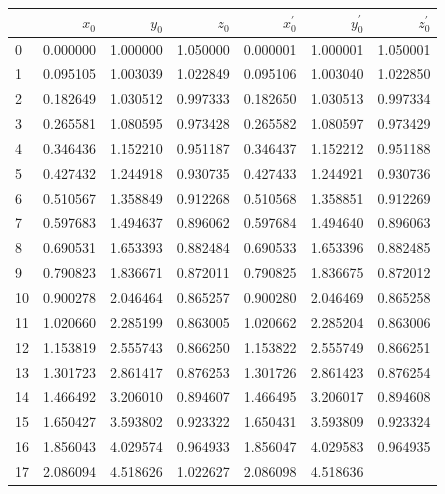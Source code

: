 \documentclass[12pt, a4paper]{article}
\begin{document}
	\begin{table}[H]
		\centering
		\begin{tabular}{|l|r|r|r|r|r|r|}
			\hline
			   & $x_0$    & $y_0$     & $z_0$    & $x^\prime_0$ & $y^\prime_0$ &   
			$z^\prime_0$
			\\
			\hline
			0  & 0.000000 & 1.000000  & 1.050000 & 0.000001     & 1.000001     &   
			1.050001
			\\
			1  & 0.095105 & 1.003039  & 1.022849 & 0.095106     & 1.003040     &   
			1.022850
			\\
			2  & 0.182649 & 1.030512  & 0.997333 & 0.182650     & 1.030513     &   
			0.997334
			\\
			3  & 0.265581 & 1.080595  & 0.973428 & 0.265582     & 1.080597     &   
			0.973429
			\\
			4  & 0.346436 & 1.152210  & 0.951187 & 0.346437     & 1.152212     &   
			0.951188
			\\
			5  & 0.427432 & 1.244918  & 0.930735 & 0.427433     & 1.244921     &   
			0.930736
			\\
			6  & 0.510567 & 1.358849  & 0.912268 & 0.510568     & 1.358851     &   
			0.912269
			\\
			7  & 0.597683 & 1.494637  & 0.896062 & 0.597684     & 1.494640     &   
			0.896063
			\\
			8  & 0.690531 & 1.653393  & 0.882484 & 0.690533     & 1.653396     &   
			0.882485
			\\
			9  & 0.790823 & 1.836671  & 0.872011 & 0.790825     & 1.836675     &   
			0.872012
			\\
			10 & 0.900278 & 2.046464  & 0.865257 & 0.900280     & 2.046469     &   
			0.865258
			\\
			11 & 1.020660 & 2.285199  & 0.863005 & 1.020662     & 2.285204     &   
			0.863006
			\\
			12 & 1.153819 & 2.555743  & 0.866250 & 1.153822     & 2.555749     &   
			0.866251
			\\
			13 & 1.301723 & 2.861417  & 0.876253 & 1.301726     & 2.861423     &   
			0.876254
			\\
			14 & 1.466492 & 3.206010  & 0.894607 & 1.466495     & 3.206017     &   
			0.894608
			\\
			15 & 1.650427 & 3.593802  & 0.923322 & 1.650431     & 3.593809     &   
			0.923324
			\\
			16 & 1.856043 & 4.029574  & 0.964933 & 1.856047     & 4.029583     &   
			0.964935
			\\
			17 & 2.086094 & 4.518626  & 1.022627 & 2.086098     & 4.518636     &   

\end{tabular}
\end{table}
\end{document}
